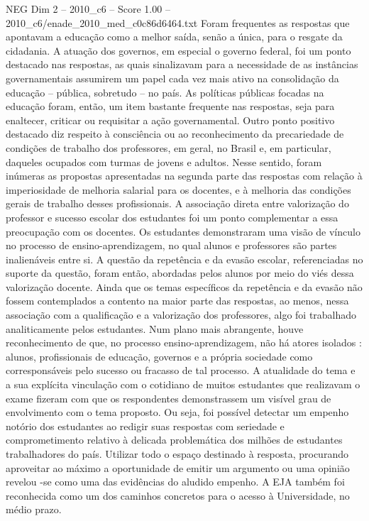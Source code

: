 \begin{textsample}{NEG Dim 2 – 2010\_c6 – Score 1.00 – 2010\_c6/enade\_2010\_med\_c0c86d6464.txt}
Foram frequentes as respostas que apontavam a educação como a melhor saída, senão a única, para o resgate da cidadania.
A atuação dos governos, em especial o governo federal, foi um ponto destacado nas respostas, as quais sinalizavam para a necessidade de as instâncias governamentais assumirem um papel cada vez mais ativo na consolidação da educação – pública, sobretudo – no país.
As políticas públicas focadas na educação foram, então, um item bastante frequente nas respostas, seja para enaltecer, criticar ou requisitar a ação governamental.
Outro ponto positivo destacado diz respeito à consciência ou ao reconhecimento da precariedade de condições de trabalho dos professores, em geral, no Brasil e, em particular, daqueles ocupados com turmas de jovens e adultos.
Nesse sentido, foram inúmeras as propostas apresentadas na segunda parte das respostas com relação à imperiosidade de melhoria salarial para os docentes, e à melhoria das condições gerais de trabalho desses profissionais.
A associação direta entre valorização do professor e sucesso escolar dos estudantes foi um ponto complementar a essa preocupação com os docentes.
Os estudantes demonstraram uma visão de vínculo no processo de ensino-aprendizagem, no qual alunos e professores são partes inalienáveis entre si.
A questão da repetência e da evasão escolar, referenciadas no suporte da questão, foram então, abordadas pelos alunos por meio do viés dessa valorização docente.
Ainda que os temas específicos da repetência e da evasão não fossem contemplados a contento na maior parte das respostas, ao menos, nessa associação com a qualificação e a valorização dos professores, algo foi trabalhado analiticamente pelos estudantes.
Num plano mais abrangente, houve reconhecimento de que, no processo ensino-aprendizagem, não há atores isolados : alunos, profissionais de educação, governos e a própria sociedade como corresponsáveis pelo sucesso ou fracasso de tal processo.
A atualidade do tema e a sua explícita vinculação com o cotidiano de muitos estudantes que realizavam o exame fizeram com que os respondentes demonstrassem um visível grau de envolvimento com o tema proposto.
Ou seja, foi possível detectar um empenho notório dos estudantes ao redigir suas respostas com seriedade e comprometimento relativo à delicada problemática dos milhões de estudantes trabalhadores do país.
Utilizar todo o espaço destinado à resposta, procurando aproveitar ao máximo a oportunidade de emitir um argumento ou uma opinião revelou -se como uma das evidências do aludido empenho.
A EJA também foi reconhecida como um dos caminhos concretos para o acesso à Universidade, no médio prazo.

\end{textsample}
